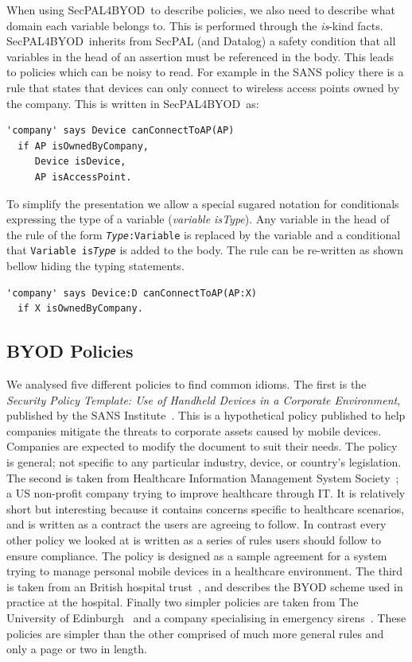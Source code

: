 \documentclass{llncs}
\newcommand{\AppPAL}[0]{SecPAL4BYOD}
\begin{document}
When using \AppPAL~to describe policies, we also need to describe what domain each variable belongs to.
This is performed through the \emph{is}-kind facts.
\AppPAL~inherits from SecPAL (and Datalog) a safety condition that all variables in the head of an assertion must be referenced in the body.
This leads to policies which can be noisy to read.
For example in the SANS policy there is a rule that states that devices can only connect to wireless access points owned by the company.
This is written in \AppPAL~as:
\begin{lstlisting}
'company' says Device canConnectToAP(AP)
  if AP isOwnedByCompany,
     Device isDevice,
     AP isAccessPoint.
\end{lstlisting}
To simplify the presentation we allow a special sugared notation for conditionals expressing the type of a variable (\emph{variable \emph{is}Type}).
Any variable in the head of the rule of the form \texttt{\emph{Type}:Variable} is replaced by the variable and a conditional that \texttt{Variable is\emph{Type}} is added to the body.
The rule can be re-written as shown bellow hiding the typing statements.
\begin{lstlisting}
'company' says Device:D canConnectToAP(AP:X)
  if X isOwnedByCompany.
\end{lstlisting}

\subsection{BYOD Policies}
\label{ssec:byod-policies}

We analysed five different policies to find common idioms.
The first is the \emph{Security Policy Template: Use of Handheld Devices in a Corporate Environment}, published by the SANS Institute~\cite{nicholas_r._c._guerin_security_2008}.
This is a hypothetical policy published to help companies mitigate the threats to corporate assets caused by mobile devices.
Companies are expected to modify the document to suit their needs.
The policy is general; not specific to any particular industry, device, or country's legislation.
The second is taken from Healthcare Information Management System Society~\cite{healthcare_information_and_management_systems_society_mobile_2012};
  a US non-profit company trying to improve healthcare through IT.
It is relatively short but interesting because it contains concerns specific to healthcare scenarios, and is written as a contract the users are agreeing to follow.
In contrast every other policy we looked at is written as a series of rules users should follow to ensure compliance.
The policy is designed as a sample agreement for a system trying to manage personal mobile devices in a healthcare environment.
The third is taken from an British hospital trust~\cite{kennington_mobiles_2014}, and describes the BYOD scheme used in practice at the hospital.
Finally two simpler policies are taken from The University of Edinburgh~\cite{david_williamson_bring_2015} and a company specialising in emergency sirens~\cite{code3pse.org_sample_????}.
These policies are simpler than the other comprised of much more general rules and only a page or two in length.
\end{document}
